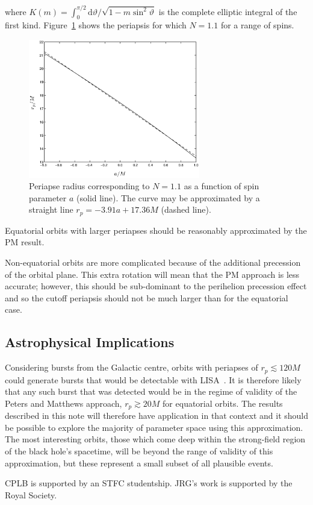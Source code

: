 \documentclass[aps,prd,amsfonts,amssymb,amsmath,nofootinbib,floatfix,reprint,showpacs,groupedaddress]{revtex4-1}
\newcommand{\Figref}[1]{Figure~\ref{fig:#1}}
\newcommand{\dd}{\ensuremath{\mathrm{d}}}
\begin{document}
where $K(m) = \int_{0}^{\pi/2}{\dd\vartheta/\sqrt{1-m\sin^2\vartheta}}$ is the complete elliptic integral of the first kind. \Figref{N_peri} shows the periapsis for which $N = 1.1$ for a range of spins.
\begin{figure}
\includegraphics[width=75mm]{N_peri_3.eps}
\caption{Periapse radius corresponding to $N = 1.1$ as a function of spin parameter $a$ (solid line). The curve may be approximated by a straight line $r_{p} = -3.91 a + 17.36M$ (dashed line).\label{fig:N_peri}}
\end{figure}
Equatorial orbits with larger periapses should be reasonably approximated by the PM result.

Non-equatorial orbits are more complicated because of the additional precession of the orbital plane. This extra rotation will mean that the PM approach is less accurate; however, this should be sub-dominant to the perihelion precession effect and so the cutoff periapsis should not be much larger than for the equatorial case.

\subsection{Astrophysical Implications}

Considering bursts from the Galactic centre, orbits with periapses of $r_{p} \lesssim 120 M$ could generate bursts that would be detectable with LISA~\cite{Rubbo2006, Hopman2007}. It is therefore likely that any such burst that was detected would be in the regime of validity of the Peters and Matthews approach, $r_{p} \gtrsim 20 M$ for equatorial orbits. The results described in this note will therefore have application in that context and it should be possible to explore the majority of parameter space using this approximation. The most interesting orbits, those which come deep within the strong-field region of the black hole's spacetime, will be beyond the range of validity of this approximation, but these represent a small subset of all plausible events.

\begin{acknowledgments}
CPLB is supported by an STFC studentship. JRG's work is supported by the Royal Society.
\end{acknowledgments}


\end{document}
